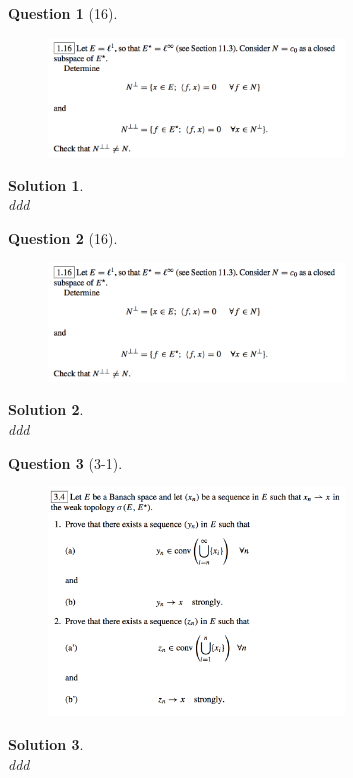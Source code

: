 \documentclass{article} %
\theoremstyle{quest}
\newtheorem*{question}{Question}
\newtheorem*{solution}{Solution}
\begin{document}
\newpage

\begin{question}[16]
\hfill
\begin{figure}[h!]
  \centering
    \includegraphics[width=0.7\textwidth]{funcA-1-16.png}
\end{figure}
\end{question}
\begin{solution} \hfill \\
ddd 
\end{solution}

\newpage

\begin{question}[16]
\hfill
\begin{figure}[h!]
  \centering
    \includegraphics[width=0.7\textwidth]{funcA-1-16.png}
\end{figure}
\end{question}
\begin{solution} \hfill \\
ddd 
\end{solution}

\newpage

\begin{question}[3-1]
\hfill
\begin{figure}[h!]
  \centering
    \includegraphics[width=0.7\textwidth]{func-c3-p1.png}
\end{figure}
\end{question}
\begin{solution} \hfill \\
ddd 
\end{solution}
\end{document}
